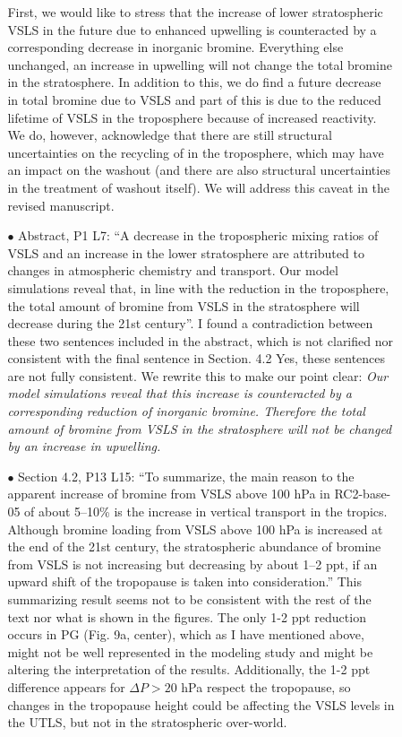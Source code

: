 \begin{itemize}
\begin{itemize}
\begin{itemize}
    First, we would like to stress that the increase of lower stratospheric VSLS in the future due to enhanced upwelling is counteracted by a corresponding decrease in inorganic bromine. Everything else unchanged, an increase in upwelling will not change the total bromine in the stratosphere. In addition to this, we do find a future decrease in total bromine due to VSLS and part of this is due to the reduced lifetime of VSLS in the troposphere because of increased  reactivity. We do, however, acknowledge that there are still structural uncertainties on the recycling of  in the troposphere, which may have an impact on the washout (and there are also structural uncertainties in the treatment of washout itself). We will address this caveat in the revised manuscript.
  \item[$\bullet$]{\color{blue}Abstract, P1 L7: ``A decrease in the tropospheric mixing ratios of VSLS and an increase in the lower stratosphere are attributed to changes in atmospheric chemistry and transport. Our model simulations reveal that, in line with the reduction in the troposphere, the total amount of bromine from VSLS in the stratosphere will decrease during the 21st century''. I found a contradiction between these two sentences included in the abstract, which is not clarified nor consistent with the final sentence in Section. 4.2}
    Yes, these sentences are not fully consistent. We rewrite this to make our point clear: \emph{Our model simulations reveal that this increase is counteracted by a corresponding reduction of inorganic bromine. Therefore the total amount of bromine from VSLS in the stratosphere will not be changed by an increase in upwelling.}
  \item[$\bullet$]{\color{blue}Section 4.2, P13 L15: ``To summarize, the main reason to the apparent increase of bromine from VSLS above 100 hPa in RC2-base-05 of about 5–10\% is the increase in vertical transport in the tropics. Although bromine loading from VSLS above 100 hPa is increased at the end of the 21st century, the stratospheric abundance of bromine from VSLS is not increasing but decreasing by about 1–2 ppt, if an upward shift of the tropopause is taken into consideration.'' This summarizing result seems not to be consistent with the rest of the text nor what is shown in the figures. The only 1-2 ppt reduction occurs in  PG (Fig. 9a, center), which as I have mentioned above, might not be well represented in the modeling study and might be altering the interpretation of the results. Additionally, the 1-2 ppt difference appears for $\Delta P > 20$ hPa respect the tropopause, so changes in the tropopause height could be affecting the VSLS  levels in the UTLS, but not in the stratospheric over-world.}

\end{itemize}
\end{itemize}
\end{itemize}
